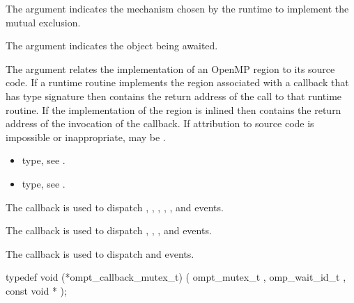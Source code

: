 The argument  indicates the mechanism chosen by the
runtime to implement the mutual exclusion.

The argument  indicates the object being awaited.

The  argument relates the implementation of an OpenMP region
to its source code. If a runtime routine implements the region associated with
a callback that has type signature  then
 contains the return address of the call to that runtime routine.
If the implementation of the region is inlined then  contains the
return address of the invocation of the callback. If attribution to source code
is impossible or inappropriate, may be .

\crossreferences
\begin{itemize}
\item {} type, see
.
\item {} type, see
.
\end{itemize}



\label{sec:ompt_callback_mutex_t}
\summary
The  callback is used to dispatch
, ,
,  ,
,  and
 events.

The  callback is used to dispatch
, ,
,  and
 events.

The  callback is used to dispatch
 and  events.

\format

\begin{ccppspecific}
\begin{omptCallback}
typedef void (*ompt_callback_mutex_t) (
  ompt_mutex_t ,
  omp_wait_id_t ,
  const void *
);
\end{omptCallback}
\end{ccppspecific}


\record

